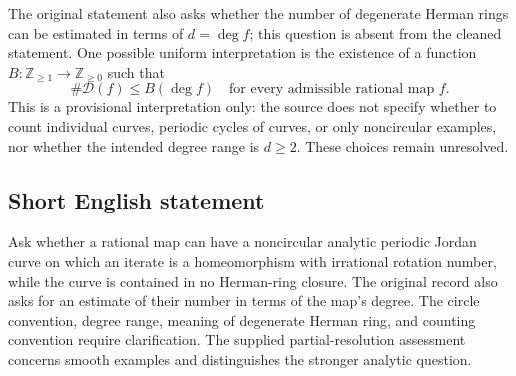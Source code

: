 \documentclass[11pt]{article}
\newcommand{\Z}{\mathbb{Z}}
\begin{document}
The original statement also asks whether the number of degenerate Herman rings can be estimated in terms of \(d=\deg f\); this question is absent from the cleaned statement. One possible uniform interpretation is the existence of a function \(B:\Z_{\geq 1}\to\Z_{\geq 0}\) such that
\[
\#\mathcal D(f)\leq B(\deg f)
\quad\text{for every admissible rational map }f.
\]
This is a provisional interpretation only: the source does not specify whether to count individual curves, periodic cycles of curves, or only noncircular examples, nor whether the intended degree range is \(d\geq 2\). These choices remain unresolved.
\subsection{Short English statement}
Ask whether a rational map can have a noncircular analytic periodic Jordan curve on which an iterate is a homeomorphism with irrational rotation number, while the curve is contained in no Herman-ring closure. The original record also asks for an estimate of their number in terms of the map's degree. The circle convention, degree range, meaning of degenerate Herman ring, and counting convention require clarification. The supplied partial-resolution assessment concerns smooth examples and distinguishes the stronger analytic question.
\end{document}
